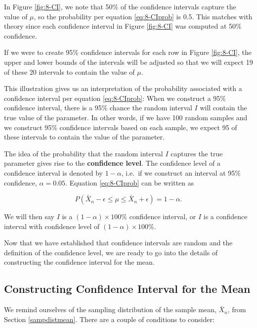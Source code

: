 \documentclass[
]{book}
\begin{document}
In Figure \ref{fig:8-CI}, we note that 50\% of the confidence intervals capture the value of \(\mu\), so the probability per equation \eqref{eq:8-CIprob} is 0.5. This matches with theory since each confidence interval in Figure \ref{fig:8-CI} was computed at 50\% confidence.

If we were to create 95\% confidence intervals for each row in Figure \ref{fig:8-CI}, the upper and lower bounds of the intervals will be adjusted so that we will expect 19 of these 20 intervals to contain the value of \(\mu\).

This illustration gives us an interpretation of the probability associated with a confidence interval per equation \eqref{eq:8-CIprob}: When we construct a 95\% confidence interval, there is a 95\% chance the random interval \(I\) will contain the true value of the parameter. In other words, if we have 100 random samples and we construct 95\% confidence intervals based on each sample, we expect 95 of these intervals to contain the value of the parameter.

The idea of the probability that the random interval \(I\) captures the true parameter gives rise to the \textbf{confidence level}. The confidence level of a confidence interval is denoted by \(1-\alpha\), i.e.~if we construct an interval at 95\% confidence, \(\alpha=0.05\). Equation \eqref{eq:8-CIprob} can be written as

\begin{equation} 
P(\bar{X}_n - \epsilon \leq \mu \leq \bar{X}_n + \epsilon) = 1 - \alpha.
\label{eq:8-CIalpha}
\end{equation}

We will then say \(I\) is a \((1-\alpha) \times 100\%\) confidence interval, or \(I\) is a confidence interval with confidence level of \((1-\alpha) \times 100\%\).

Now that we have established that confidence intervals are random and the definition of the confidence level, we are ready to go into the details of constructing the confidence interval for the mean.

\subsection{Constructing Confidence Interval for the Mean}\label{constructing-confidence-interval-for-the-mean}

We remind ourselves of the sampling distribution of the sample mean, \(\bar{X}_n\), from Section \ref{sampdistmean}. There are a couple of conditions to consider:
\end{document}
